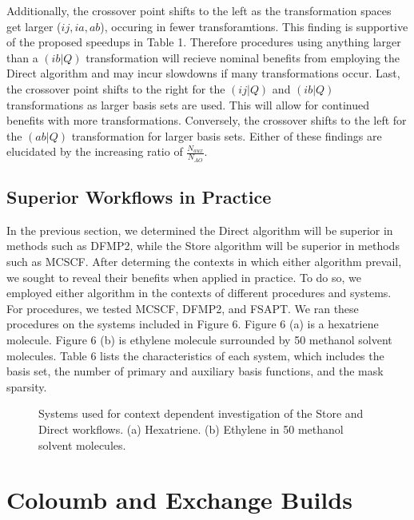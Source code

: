 Additionally, the crossover point shifts to the left as the transformation spaces get larger ($ij, ia, ab$), occuring in fewer transforamtions.
This finding is supportive of the proposed speedups in Table 1.
Therefore procedures using anything larger than a $(ib|Q)$ transformation will recieve nominal benefits from employing the 
Direct algorithm and may incur slowdowns if many transformations occur.
Last, the crossover point shifts to the right for the $(ij|Q)$ and $(ib|Q)$ transformations as larger basis sets are used. 
This will allow for 
continued benefits with more transformations. Conversely, the crossover shifts to the left for the $(ab|Q)$ transformation
for larger basis sets. Either of these findings are elucidated
by the increasing ratio of $\frac{N_{aux}}{N_{AO}}$. 
 
\subsection{Superior Workflows in Practice}

In the previous section, we determined the Direct algorithm will be superior in methods such as DFMP2, while the Store 
algorithm will be superior in methods such as MCSCF.
After determing the contexts in which either algorithm prevail, we sought to reveal their benefits when applied in practice. 
To do so, we employed either algorithm
in the contexts of different procedures and systems.  For procedures, we tested MCSCF, DFMP2, and FSAPT.  We ran these 
procedures on the systems included in Figure 6.
Figure 6 (a) is a hexatriene molecule.  Figure 6 (b) is ethylene molecule surrounded by 50 methanol solvent molecules.
Table 6 lists the characteristics of each system,
which includes the basis set, the number of primary and auxiliary basis functions, and the mask sparsity. 

\begin{figure}[H]
  \captionsetup[subfigure]{}
  \centering
  \hfill
  \caption{Systems used for context dependent investigation of the Store and Direct workflows. (a) Hexatriene. (b) Ethylene in 50 methanol solvent molecules. }
\end{figure}


\section{Coloumb and Exchange Builds}

 



